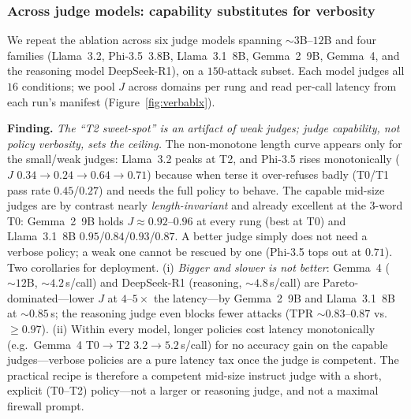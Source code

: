 \documentclass[11pt]{article}
\begin{document}
\subsubsection{Across judge models: capability substitutes for verbosity}\label{sec:verbablx}
We repeat the ablation across six judge models spanning ${\sim}3$B--$12$B and four
families (Llama~3.2, Phi-3.5~3.8B, Llama~3.1~8B, Gemma~2~9B, Gemma~4, and the
reasoning model DeepSeek-R1), on a $150$-attack subset. Each model judges all $16$
conditions; we pool $J$ across domains per rung and read per-call latency from each
run's manifest (Figure~\ref{fig:verbablx}).

\medskip\noindent\textbf{Finding.} \emph{The ``T2 sweet-spot'' is an artifact of weak
judges; judge capability, not policy verbosity, sets the ceiling.} The non-monotone
length curve appears only for the small/weak judges: Llama~3.2 peaks at T2, and
Phi-3.5 rises monotonically ($J$ $0.34\rightarrow0.24\rightarrow0.64\rightarrow0.71$)
because when terse it over-refuses badly (T0/T1 pass rate $0.45$/$0.27$) and needs
the full policy to behave. The capable mid-size judges are by contrast nearly
\emph{length-invariant} and already excellent at the $3$-word T0: Gemma~2~9B holds
$J\approx0.92$--$0.96$ at every rung (best at T0) and Llama~3.1~8B
$0.95$/$0.84$/$0.93$/$0.87$. A better judge simply does not need a verbose policy; a
weak one cannot be rescued by one (Phi-3.5 tops out at $0.71$). Two corollaries for
deployment. (i) \emph{Bigger and slower is not better}: Gemma~4 (${\sim}12$B,
${\sim}4.2$\,s/call) and DeepSeek-R1 (reasoning, ${\sim}4.8$\,s/call) are
Pareto-dominated---lower $J$ at $4$--$5\times$ the latency---by Gemma~2~9B and
Llama~3.1~8B at ${\sim}0.85$\,s; the reasoning judge even blocks fewer attacks
(TPR ${\sim}0.83$--$0.87$ vs.\ ${\geq}0.97$). (ii) Within every model, longer
policies cost latency monotonically (e.g.\ Gemma~4 T0$\rightarrow$T2
$3.2\rightarrow5.2$\,s/call) for no accuracy gain on the capable judges---verbose
policies are a pure latency tax once the judge is competent. The practical recipe
is therefore a competent mid-size instruct judge with a short, explicit
(T0--T2) policy---not a larger or reasoning judge, and not a maximal firewall prompt.
\end{document}
